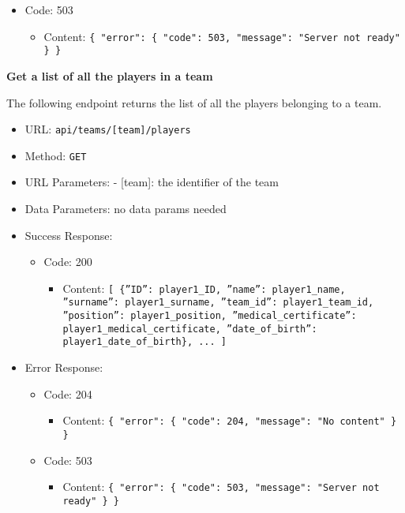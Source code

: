 \begin{itemize}
\begin{itemize}
        \item Code: 503
            \begin{itemize}
                \item Content: \texttt{\{ "error": \{ "code": 503, "message": "Server not ready" \} \}}
            \end{itemize}
    \end{itemize}
\end{itemize}


\textbf{Get a list of all the players in a team}

The following endpoint returns the list of all the players belonging to a team.
\begin{itemize}
    \item URL: \texttt{api/teams/[team]/players}
    \item Method: \texttt{GET}
    \item URL Parameters: - [team]: the identifier of the team
    \item Data Parameters: no data params needed
    \item Success Response: 
    \begin{itemize}
        \item Code: 200
            \begin{itemize}
                \item Content: \texttt{[ \{”ID”: player1\_ID, ”name”: player1\_name, ”surname”: player1\_surname, ”team\_id”: player1\_team\_id, ”position”: player1\_position, ”medical\_certificate”: player1\_medical\_certificate, ”date\_of\_birth”: player1\_date\_of\_birth\}, ... ]}
            \end{itemize}
    \end{itemize}
    \item Error Response: 
    \begin{itemize}
        \item Code: 204
        \begin{itemize}
            \item Content: \texttt{\{ "error": \{ "code": 204, "message": "No content" \} \}}
        \end{itemize}
        
        \item Code: 503
        \begin{itemize}
            \item Content: \texttt{\{ "error": \{ "code": 503, "message": "Server not ready" \} \}}
        \end{itemize}
    \end{itemize}
\end{itemize}

